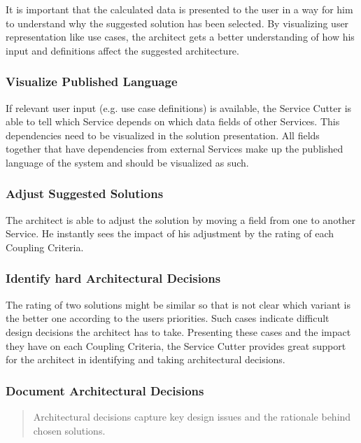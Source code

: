 It is important that the calculated data is presented to the user in a way for him to understand why the suggested solution has been selected. By visualizing user representation like use cases, the architect gets a better understanding of how his input and definitions affect the suggested architecture. 

\subsubsection{Visualize Published Language}

If relevant user input (e.g. use case definitions) is available, the Service Cutter is able to tell which Service depends on which data fields of other Services. This dependencies need to be visualized in the solution presentation. All fields together that have dependencies from external Services make up the published language of the system and should be visualized as such.

\subsubsection{Adjust Suggested Solutions}

The architect is able to adjust the solution by moving a field from one to another Service. He instantly sees the impact of his adjustment by the rating of each Coupling Criteria.

\subsubsection{Identify hard Architectural Decisions}

The rating of two solutions might be similar so that is not clear which variant is the better one according to the users priorities. Such cases indicate difficult design decisions the architect has to take. Presenting these cases and the impact they have on each Coupling Criteria, the Service Cutter provides great support for the architect in identifying and taking architectural decisions.

\subsubsection{Document Architectural Decisions}

\begin{quote}
	Architectural decisions capture key design issues and the rationale behind chosen solutions.\cite{zioAD}
\end{quote}

